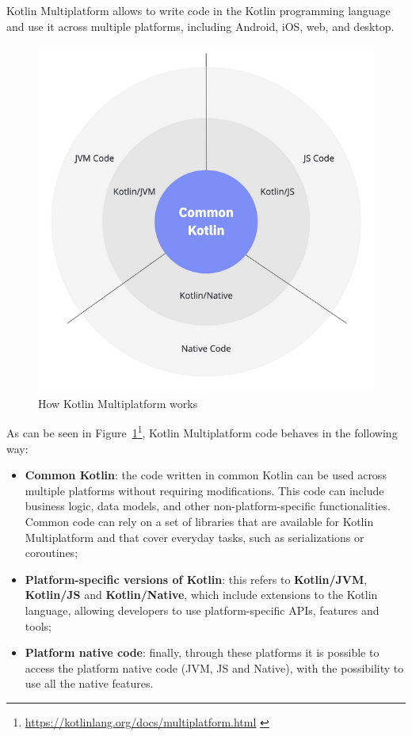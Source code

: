 Kotlin Multiplatform allows to write code in the Kotlin programming language and use it across multiple platforms, including Android, iOS, web, and desktop.
\begin{figure}[!ht]
    \centering
    \includegraphics[scale=0.9]{document/chapters/4-collektive/images/kotlin_multiplatform_code.png}
    \caption{How Kotlin Multiplatform works}
    \label{fig:km_code_work}
\end{figure}
As can be seen in Figure~\ref{fig:km_code_work}\footnote{\url{https://kotlinlang.org/docs/multiplatform.html} \label{km_footnote}}, Kotlin Multiplatform code behaves in the following way:
\begin{itemize}
    \item \textbf{Common Kotlin}: the code written in common Kotlin can be used across multiple platforms without requiring modifications. This code can include business logic, data models, and other non-platform-specific functionalities. Common code can rely on a set of libraries that are available for Kotlin Multiplatform and that cover everyday tasks, such as serializations or coroutines;
    \item \textbf{Platform-specific versions of Kotlin}: this refers to \textbf{Kotlin/JVM}, \textbf{Kotlin/JS} and \textbf{Kotlin/Native}, which include extensions to the Kotlin language, allowing developers to use platform-specific APIs, features and tools;
    \item \textbf{Platform native code}: finally, through these platforms it is possible to access the platform native code (JVM, JS and Native), with the possibility to use all the native features.
\end{itemize}

